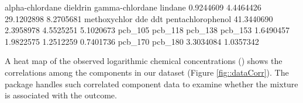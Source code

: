 \begin{Schunk}
\begin{Soutput}
  alpha-chlordane          dieldrin   gamma-chlordane           lindane 
        0.9244609         4.4464426        29.1202898         8.2705681 
     methoxychlor               dde               ddt pentachlorophenol 
       41.3440690         2.3958978         4.5525251         5.1020673 
          pcb_105           pcb_118           pcb_138           pcb_153 
        1.6490457         1.9822575         1.2512259         0.7401736 
          pcb_170           pcb_180 
        3.3034084         1.0357342 
\end{Soutput}
\end{Schunk}

A heat map of the observed logarithmic chemical concentrations
() shows the correlations among the components in
our dataset (Figure \ref{fig::dataCorr}). The  package
handles such correlated component data to examine whether the mixture is
associated with the outcome.


